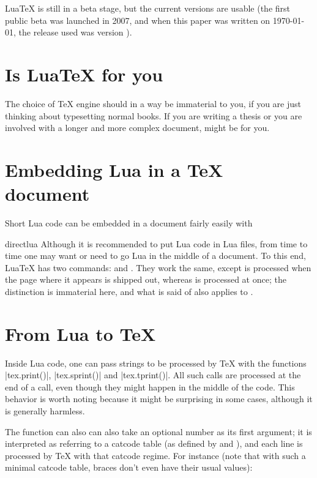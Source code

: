 Lua\TeX{} is still in a beta stage, but the current versions are usable (the first public beta was launched in 2007,
and when this paper was written on \today, the release used was version \the\luatexversion). 

\section{Is LuaTeX for you}

The choice of TeX engine should in a way be immaterial to you, if you are just thinking about typesetting normal books. If you are writing a thesis or you are involved with a longer and more complex document, \lualatex might be for you. 

\section{Embedding Lua in a TeX document}

Short Lua code can be embedded in a document fairly easily with 
\begin{docCommand}{directlua}{}
Although it is recommended to put Lua code in Lua files, from time to time one may want or need to go Lua in the middle of a document. To this end, LuaTeX has two commands: \cmd{\directlua} and \cmd{\latelua}. They work the same, except \cmd{\latelua} is processed when the page where it appears is shipped out, whereas \cmd{\directlua} is processed at once; the distinction is immaterial here, and what is said of \cmd{\directlua} also applies to \cmd{\latelua}.
\end{docCommand}

\section{From Lua to TeX}

Inside Lua code, one can pass strings to be processed by TeX with the functions |tex.print()|, |tex.sprint()| and |tex.tprint()|. All such calls are processed at the end of a  call, even though they might happen in the middle of the code. This behavior is worth noting because it might be surprising in some cases, although it is generally harmless.

The function can also can also take an optional number as its first argument; it is interpreted as referring to a catcode table (as defined by  and ), and each line is processed by TeX with that catcode regime. For instance (note that with such a minimal catcode table, braces don't even have their usual values):


